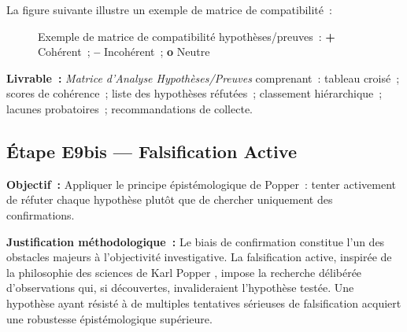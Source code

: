 La figure suivante illustre un exemple de matrice de compatibilité~:

\begin{figure}[H]
\centering
{}
\caption{Exemple de matrice de compatibilité hypothèses/preuves~:
\textbf{+} Cohérent~; \textbf{--} Incohérent~; \textbf{o} Neutre}
\label{fig:matrice-ach}
\end{figure}

\textbf{Livrable~:} \textit{Matrice d'Analyse Hypothèses/Preuves} comprenant~:
tableau croisé~; scores de cohérence~; liste des hypothèses réfutées~;
classement hiérarchique~; lacunes probatoires~; recommandations de collecte.

\subsection{Étape E9bis --- Falsification Active}

\textbf{Objectif~:} Appliquer le principe épistémologique de Popper~: tenter
activement de réfuter chaque hypothèse plutôt que de chercher uniquement des
confirmations.

\textbf{Justification méthodologique~:} Le biais de confirmation constitue l'un
des obstacles majeurs à l'objectivité investigative. La falsification active,
inspirée de la philosophie des sciences de Karl Popper \cite{popper1973},
impose la recherche délibérée d'observations qui, si découvertes, invalideraient
l'hypothèse testée. Une hypothèse ayant résisté à de multiples tentatives
sérieuses de falsification acquiert une robustesse épistémologique supérieure.

